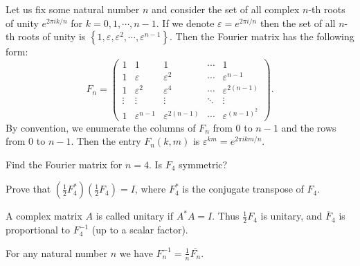 Let us fix some natural number $n$ and consider the set of all complex $n$-th roots of unity $e^{2\pi i k/n}$ for $k = 0, 1, \cdots, n-1$. If we denote $\varepsilon = e^{2\pi i /n}$ then the set of all $n$-th roots of unity is $\left\{1, \varepsilon, \varepsilon^2, \cdots, \varepsilon^{n-1}\right\}$. Then the Fourier matrix has the following form:
$$
F_n = \begin{pmatrix}
1 & 1 & 1 & \cdots & 1 \\
1 & \varepsilon & \varepsilon^2 & \cdots & \varepsilon^{n-1} \\
1 & \varepsilon^2 & \varepsilon^4 & \cdots & \varepsilon^{2(n-1)} \\
\vdots & \vdots & \vdots & \ddots & \vdots \\
1 & \varepsilon^{n-1} & \varepsilon^{2(n-1)} & \cdots & \varepsilon^{(n-1)^2}
\end{pmatrix}.
$$
By convention, we enumerate the columns of $F_n$ from $0$ to $n-1$ and the rows from $0$ to $n-1$. Then the entry $F_n(k, m)$ is $\varepsilon^{km} = e^{2\pi i k m /n}$.

\begin{exercise}
Find the Fourier matrix for $n = 4$. Is $F_4$ symmetric?
\end{exercise}

\begin{exercise}
Prove that $(\frac{1}{2} F_4^*)(\frac{1}{2} F_4)= I$, where $F_4^*$ is the conjugate transpose of $F_4$.
\end{exercise}

A complex matrix $A$ is called unitary if $A^*A = I$. Thus $\frac{1}{2} F_4$ is unitary, and $\overline{F}_4$ is proportional to $F_4^{-1}$ (up to a scalar factor).

\begin{lemma}
For any natural number $n$ we have $F_n^{-1} = \frac{1}{n} \overline{F_n}$.
\end{lemma}


